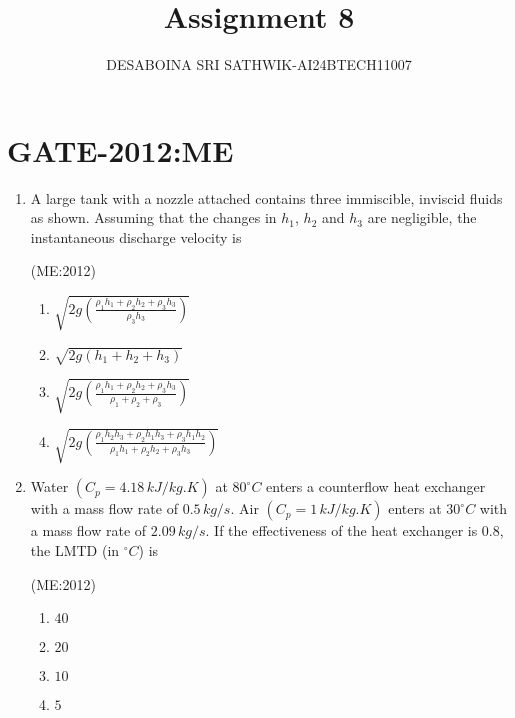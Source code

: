\documentclass[journal,12pt,onecolumn]{IEEEtran}
\theoremstyle{remark}
\begin{document}

\vspace{3cm}

\title{Assignment 8}
\author{DESABOINA SRI SATHWIK-AI24BTECH11007}
\maketitle
\bigskip

\section*{GATE-2012:ME}
\label{}
\begin{enumerate}
    \item A large tank with a nozzle attached contains three immiscible, inviscid fluids as shown. Assuming that the changes in $h_1$, $h_2$ and $h_3$ are negligible, the instantaneous discharge velocity is
	    \vspace{1cm}
    \begin{center}
	    
    \end{center}
	    \hfill{(ME:2012)}
		\begin{multicols}{2}
    \begin{enumerate}
        \item $ \sqrt{2g \left( \frac{\rho_1 h_1 + \rho_2 h_2 + \rho_3 h_3}{\rho_3 h_3} \right)} $
        \item $\sqrt{2g(h_1 + h_2 + h_3)}$
	\item $\sqrt{2g (\frac{\rho_1 h_1 + \rho_2 h_2 + \rho_3 h_3}{\rho_1 + \rho_2 + \rho_3})}$
	\item $\sqrt{2g (\frac{\rho_1 h_2 h_3 + \rho_2 h_1 h_3 + \rho_3 h_1 h_2}{\rho_1 h_1 + \rho_2 h_2 + \rho_3 h_3})}$
    \end{enumerate}
		\end{multicols}

    \item Water $(C_p = 4.18 \, kJ/kg.K)$ at $80^\circ C$ enters a counterflow heat exchanger with a mass flow rate of $0.5 \, kg/s$. Air $(C_p = 1 \, kJ/kg.K)$ enters at $30^\circ C$ with a mass flow rate of $2.09 \, kg/s$. If the effectiveness of the heat exchanger is 0.8, the LMTD (in $^\circ C$) is

	     \hfill{(ME:2012)}
		\begin{multicols}{4}
    \begin{enumerate}
        \item $40$
        \item $20$
        \item $10$
        \item $5$
    \end{enumerate}
\end{multicols}


\end{enumerate}
\end{document}
